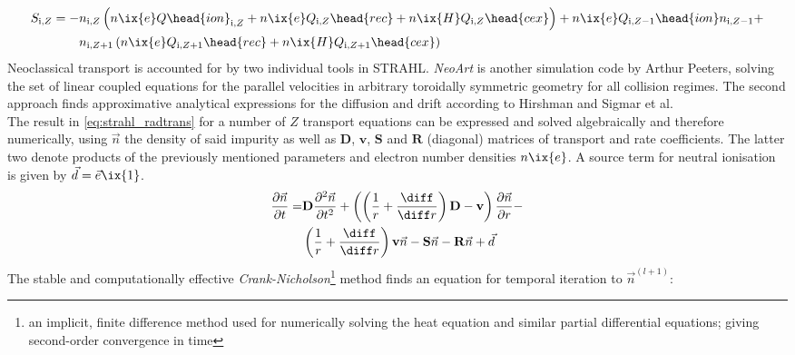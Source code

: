 %
            \begin{align}%
                \begin{split}%
                    S_{\text{i,}Z}=-&n_{\text{i,}Z}\left(n\ix{e}Q\head{ion}_{\text{i,}Z}+n\ix{e}Q_{\text{i,}Z}\head{rec}+n\ix{H}Q_{\text{i,}Z}\head{cex}\right)+n\ix{e}Q_{\text{i,}Z-1}\head{ion}n_{\text{i,}Z-1}+\\%
                    &n_{\text{i,}Z+1}\left(n\ix{e}Q_{\text{i,}Z+1}\head{rec}+n\ix{H}Q_{\text{i,}Z+1}\head{cex}\right)%
                \end{split}%
            \end{align}%
%
            Neoclassical transport is accounted for by two individual tools in STRAHL. \textit{NeoArt} is another simulation code by Arthur Peeters, solving the set of linear coupled equations for the parallel velocities in arbitrary toroidally symmetric geometry for all collision regimes\cite{Peeters2000}. The second approach finds approximative analytical expressions for the diffusion and drift according to Hirshman and Sigmar et al.\cite{Hirshman1981}\\%
            The result in \cref{eq:strahl_radtrans} for a number of $Z$ transport equations can be expressed and solved algebraically and therefore numerically, using $\vec{n}$ the density of said impurity as well as $\mathbf{D}$, $\mathbf{v}$, $\mathbf{S}$ and $\mathbf{R}$ (diagonal) matrices of transport and rate coefficients. The latter two denote products of the previously mentioned parameters and electron number densities $n\ix{e}$. A source term for neutral ionisation is given by $\vec{d}=\vec{e}\ix{1}$.%
%
            \begin{align}%
                \begin{split}%
                    \frac{\partial\vec{n}}{\partial t}=&\mathbf{D}\frac{\partial^{2}\vec{n}}{\partial t^{2}}+\left(\left(\frac{1}{r}+\frac{\diff}{\diff r}\right)\mathbf{D}-\mathbf{v}\right)\frac{\partial\vec{n}}{\partial r}-\\%
                    &\left(\frac{1}{r}+\frac{\diff}{\diff r}\right)\mathbf{v}\vec{n}-\mathbf{S}\vec{n}-\mathbf{R}\vec{n}+\vec{d}%
                \end{split}%
            \end{align}%
%
            The stable and computationally effective \textit{Crank-Nicholson}\footnote[1]{an implicit, finite difference method used for numerically solving the heat equation and similar partial differential equations; giving second-order convergence in time}\cite{WikiCrankNicholson} method finds an equation for temporal iteration to $\vec{n}^{\left(l+1\right)}$:%
